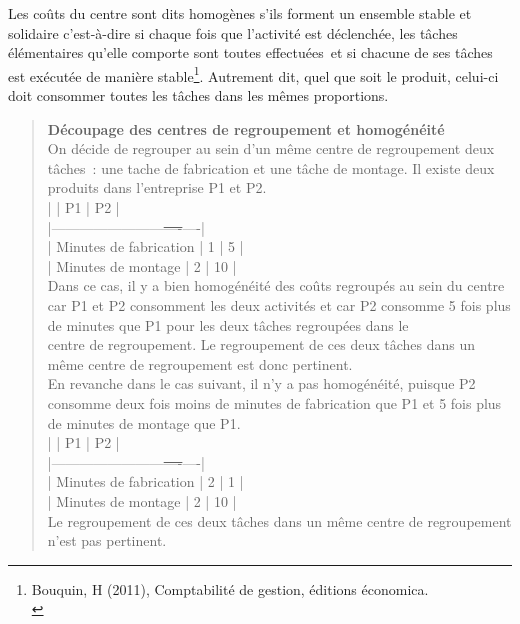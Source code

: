 \documentclass{tufte-handout}
\begin{document}
\begin{enumerate}
\begin{enumerate}
Les coûts du centre sont dits homogènes s'ils forment un ensemble stable et solidaire c'est-à-dire si chaque fois que l'activité est déclenchée, les tâches élémentaires qu'elle comporte sont toutes effectuées et si chacune de ses tâches est exécutée de manière stable\footnote{Bouquin, H (2011), Comptabilité de gestion, éditions économica.\\}. Autrement dit, quel que soit le produit, celui-ci doit consommer toutes les tâches dans les mêmes proportions.\\

\begin{verse}
\textbf{Découpage des centres de regroupement et homogénéité}\\
\vspace*{1em}
On décide de regrouper au sein d'un même centre de regroupement deux tâches : une tache de fabrication et une tâche de montage. Il existe deux produits dans l'entreprise P1 et P2.\\
\vspace*{1em}
|                        | P1 | P2 |\\
|------------------------\sout{----}----|\\
| Minutes de fabrication | 1  | 5  |\\
| Minutes de montage     | 2  | 10 |\\
\vspace*{1em}
Dans ce cas, il y a bien homogénéité des coûts regroupés au sein du centre car P1 et P2 consomment les deux activités et car P2 consomme 5 fois plus de minutes que P1 pour les deux tâches regroupées dans le\\
centre de regroupement. Le regroupement de ces deux tâches dans un même centre de regroupement est donc pertinent.\\
\vspace*{1em}
En revanche dans le cas suivant, il n'y a pas homogénéité, puisque P2 consomme deux fois moins de minutes de fabrication que P1 et 5 fois plus de minutes de montage que P1.\\
\vspace*{1em}
|                        | P1 | P2 |\\
|------------------------\sout{----}----|\\
| Minutes de fabrication | 2  | 1  |\\
| Minutes de montage     | 2  | 10 |\\
\vspace*{1em}
Le regroupement de ces deux tâches dans un même centre de regroupement n'est pas pertinent.\\
\end{verse}


\end{enumerate}
\end{enumerate}
\end{document}

